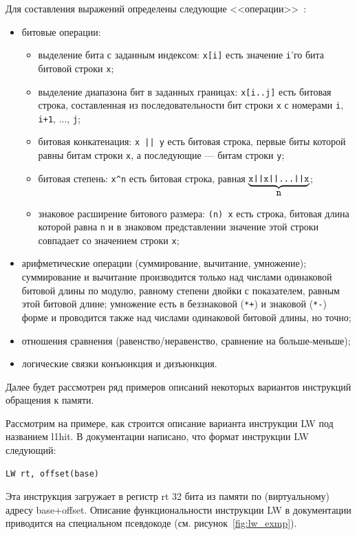 Для составления выражений определены следующие <<операции>>~\cite{my_syrcose_2008, my_isp_2008}:
\begin{itemize}
    \item битовые операции:
        \begin{itemize}
            \item выделение бита с заданным индексом: \texttt{x[i]} есть значение \texttt{i}'го бита битовой строки \texttt{x};
            \item выделение диапазона бит в заданных границах: \texttt{x[i..j]} есть битовая строка, составленная из последовательности бит строки \texttt{x} с номерами \texttt{i}, \texttt{i+1}, ..., \texttt{j};
            \item битовая конкатенация: \texttt{x || y} есть битовая строка, первые биты которой равны битам строки \texttt{x}, а последующие --- битам строки \texttt{y};
            \item битовая степень: \texttt{x\^{ }n} есть битовая строка, равная $\underbrace{\mbox{\texttt{x||x||...||x}}}_{\mbox{\texttt{n}}}$;
            \item знаковое расширение битового размера: \texttt{(n) x} есть строка, битовая длина которой равна \texttt{n} и в знаковом представлении значение этой строки совпадает со значением строки \texttt{x};
        \end{itemize}
    \item арифметические операции (суммирование, вычитание, умножение); суммирование и вычитание производится только над числами одинаковой битовой длины по модулю, равному степени двойки с показателем, равным этой битовой длине; умножение есть в беззнаковой  (\texttt{*+}) и знаковой (\texttt{*-}) форме и проводится также над числами одинаковой битовой длины, но точно;
    \item отношения сравнения (равенство/неравенство, сравнение на больше-меньше);
    \item логические связки конъюнкция и дизъюнкция.
\end{itemize}

Далее будет рассмотрен ряд примеров описаний некоторых вариантов инструкций обращения к памяти.

Рассмотрим на примере, как строится описание варианта инструкции LW под названием l1hit. В документации написано, что формат инструкции LW следующий:
\begin{verbatim}
LW rt, offset(base)
\end{verbatim}

Эта инструкция загружает в регистр rt 32 бита из памяти по (виртуальному) адресу base{+}offset. Описание функциональности инструкции LW в документации приводится на специальном псевдокоде (см. рисунок~\ref{fig:lw_exmp}).

